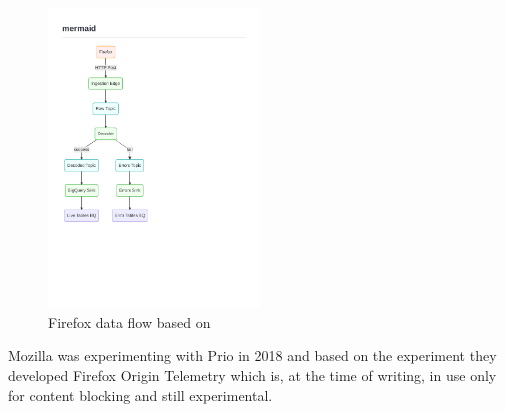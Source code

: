         
        \begin{figure}
            \centering
            \includegraphics[clip, trim=0.5cm 8cm 8cm 3.5cm, width=0.5\textwidth]{latex/figures/firefox_telemetry_graph}
            \caption[Firefox data flow]{Firefox data flow based on \cite{mozilla_overview_2020}}
            \label{fig:moz_data_flow}
        \end{figure}
    
        Mozilla was experimenting with Prio in 2018 \cite{helmer_testing_2018} and based on the experiment they developed Firefox Origin Telemetry \cite{englehardt_next_2019} which is, at the time of writing, in use only for content blocking and still     experimental\cite{noauthor_origin_nodate}.\\
    
    
